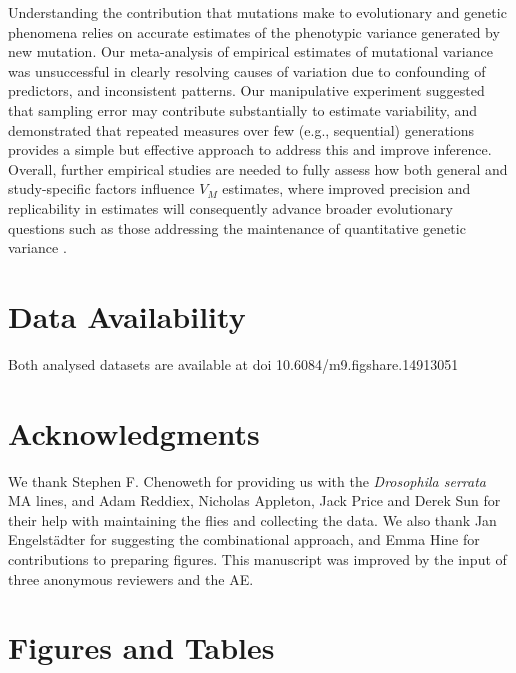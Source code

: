 Understanding the contribution that mutations make to evolutionary and genetic phenomena relies on accurate estimates of the phenotypic variance generated by new mutation. Our meta-analysis of empirical estimates of mutational variance was unsuccessful in clearly resolving causes of variation due to confounding of predictors, and inconsistent patterns. Our manipulative experiment suggested that sampling error may contribute substantially to estimate variability, and demonstrated that repeated measures over few (e.g., sequential) generations provides a simple but effective approach to address this and improve inference. Overall, further empirical studies are needed to fully assess how both general and study-specific factors influence $V_M$ estimates, where improved precision and replicability in estimates will consequently advance broader evolutionary questions such as those addressing the maintenance of quantitative genetic variance \citep{Bart89,John05,Wals18}.\par
 	 
\section*{Data Availability}  
Both analysed datasets are available at doi 10.6084/m9.figshare.14913051 \par 
 
\section*{Acknowledgments} 
We thank Stephen F. Chenoweth for providing us with the \textit{Drosophila serrata} MA lines, and Adam Reddiex, Nicholas Appleton, Jack Price and Derek Sun for their help with maintaining the flies and collecting the data. We also thank Jan Engelst\"{a}dter for suggesting the combinational approach, and Emma Hine for contributions to preparing figures. This manuscript was improved by the input of three anonymous reviewers and the AE. \par


\newpage
\section{Figures and Tables} 

